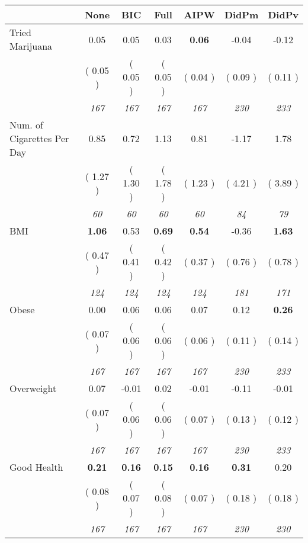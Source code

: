 \begin{tabular}{l c c c c c c}
\toprule
 & None & BIC & Full & AIPW & DidPm & DidPv \\
\midrule
Tried Marijuana &      0.05 &      0.05 &      0.03 & \textbf{     0.06} &     -0.04 &     -0.12 \\
& (     0.05 ) & (     0.05 ) & (     0.05 ) & (     0.04 ) & (     0.09 ) & (     0.11 ) \\
& \textit{ 167 } & \textit{ 167 } & \textit{ 167 } & \textit{ 167 } & \textit{ 230 } & \textit{ 233 } \\
Num. of Cigarettes Per Day &      0.85 &      0.72 &      1.13 &      0.81 &     -1.17 &      1.78 \\
& (     1.27 ) & (     1.30 ) & (     1.78 ) & (     1.23 ) & (     4.21 ) & (     3.89 ) \\
& \textit{ 60 } & \textit{ 60 } & \textit{ 60 } & \textit{ 60 } & \textit{ 84 } & \textit{ 79 } \\
BMI & \textbf{      1.06 } &      0.53 & \textbf{      0.69 } & \textbf{     0.54} &     -0.36 & \textbf{      1.63 } \\
& (     0.47 ) & (     0.41 ) & (     0.42 ) & (     0.37 ) & (     0.76 ) & (     0.78 ) \\
& \textit{ 124 } & \textit{ 124 } & \textit{ 124 } & \textit{ 124 } & \textit{ 181 } & \textit{ 171 } \\
Obese &      0.00 &      0.06 &      0.06 &      0.07 &      0.12 & \textbf{      0.26 } \\
& (     0.07 ) & (     0.06 ) & (     0.06 ) & (     0.06 ) & (     0.11 ) & (     0.14 ) \\
& \textit{ 167 } & \textit{ 167 } & \textit{ 167 } & \textit{ 167 } & \textit{ 230 } & \textit{ 233 } \\
Overweight &      0.07 &     -0.01 &      0.02 &     -0.01 &     -0.11 &     -0.01 \\
& (     0.07 ) & (     0.06 ) & (     0.06 ) & (     0.07 ) & (     0.13 ) & (     0.12 ) \\
& \textit{ 167 } & \textit{ 167 } & \textit{ 167 } & \textit{ 167 } & \textit{ 230 } & \textit{ 233 } \\
Good Health & \textbf{      0.21 } & \textbf{      0.16 } & \textbf{      0.15 } & \textbf{     0.16} & \textbf{      0.31 } &      0.20 \\
& (     0.08 ) & (     0.07 ) & (     0.08 ) & (     0.07 ) & (     0.18 ) & (     0.18 ) \\
& \textit{ 167 } & \textit{ 167 } & \textit{ 167 } & \textit{ 167 } & \textit{ 230 } & \textit{ 230 } \\

\end{tabular}
